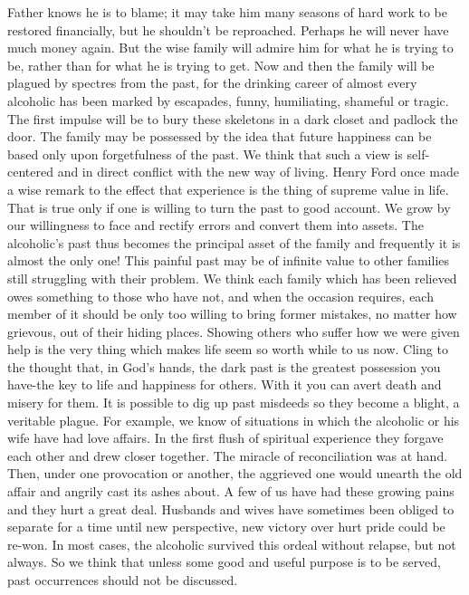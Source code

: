 \begin{biblechapter}
Father knows he is to blame; it may take him many seasons of hard work to be restored financially, but he shouldn't be reproached.  Perhaps he will never have much money again.  But the wise family will admire him for what he is trying to be, rather than for what he is trying to get.
Now and then the family will be plagued by spectres from the past, for the drinking career of almost every alcoholic has been marked by escapades, funny, humiliating, shameful or tragic.  The first impulse will be to bury these skeletons in a dark closet and padlock the door.  The family may be possessed by the idea that future happiness can be based only upon forgetfulness of the past.  We think that such a view is self-centered and in direct conflict with the new way of living.
Henry Ford once made a wise remark to the effect that experience is the thing of supreme value in life.  That is true only if one is willing to turn the past to good account.  We grow by our willingness to face and rectify errors and convert them into assets.  The alcoholic's past thus becomes the principal asset of the family and frequently it is almost the only one!
This painful past may be of infinite value to other families still struggling with their problem.  We think each family which has been relieved owes something to those who have not, and when the occasion requires, each member of it should be only too willing to bring former mistakes, no matter how grievous, out of their hiding places.  Showing others who suffer how we were given help is the very thing which makes life seem so worth while to us now.  Cling to the thought that, in God's hands, the dark past is the greatest possession you have-the key to life and happiness for others.  With it you can avert death and misery for them.
It is possible to dig up past misdeeds so they become a blight, a veritable plague.  For example, we know of situations in which the alcoholic or his wife have had love affairs.  In the first flush of spiritual experience they forgave each other and drew closer together.  The miracle of reconciliation was at hand.  Then, under one provocation or another, the aggrieved one would unearth the old affair and angrily cast its ashes about.  A few of us have had these growing pains and they hurt a great deal.  Husbands and wives have sometimes been obliged to separate for a time until new perspective, new victory over hurt pride could be re-won.  In most cases, the alcoholic survived this ordeal without relapse, but not always.  So we think that unless some good and useful purpose is to be served, past occurrences should not be discussed.

\end{biblechapter}

